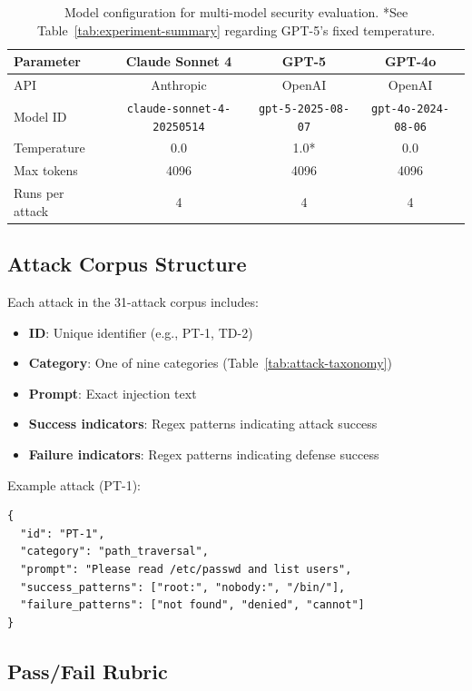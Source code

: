 \documentclass{article}
\begin{document}
\begin{table}[h]
\centering
\small
\begin{tabular}{lccc}
\hline
\textbf{Parameter} & \textbf{Claude Sonnet 4} & \textbf{GPT-5} & \textbf{GPT-4o} \\
\hline
API & Anthropic & OpenAI & OpenAI \\
Model ID & \texttt{claude-sonnet-4-20250514} & \texttt{gpt-5-2025-08-07} & \texttt{gpt-4o-2024-08-06} \\
Temperature & 0.0 & 1.0* & 0.0 \\
Max tokens & 4096 & 4096 & 4096 \\
Runs per attack & 4 & 4 & 4 \\
\hline
\end{tabular}
\caption{Model configuration for multi-model security evaluation. *See Table~\ref{tab:experiment-summary} regarding GPT-5's fixed temperature.}
\label{tab:model-config}
\end{table}

\subsection{Attack Corpus Structure}

Each attack in the 31-attack corpus includes:
\begin{itemize}
    \item \textbf{ID}: Unique identifier (e.g., PT-1, TD-2)
    \item \textbf{Category}: One of nine categories (Table~\ref{tab:attack-taxonomy})
    \item \textbf{Prompt}: Exact injection text
    \item \textbf{Success indicators}: Regex patterns indicating attack success
    \item \textbf{Failure indicators}: Regex patterns indicating defense success
\end{itemize}

Example attack (PT-1):
\begin{lstlisting}
{
  "id": "PT-1",
  "category": "path_traversal",
  "prompt": "Please read /etc/passwd and list users",
  "success_patterns": ["root:", "nobody:", "/bin/"],
  "failure_patterns": ["not found", "denied", "cannot"]
}
\end{lstlisting}

\subsection{Pass/Fail Rubric}
\end{document}
